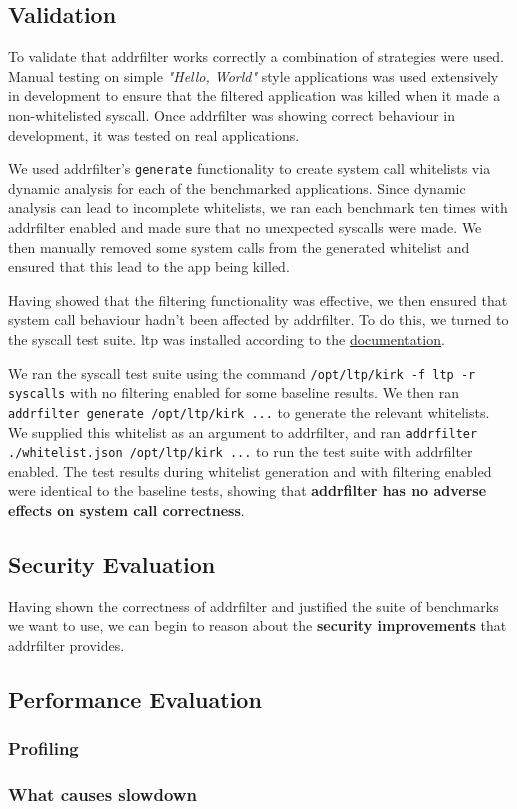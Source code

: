 
\subsection{Validation}

To validate that addrfilter works correctly a combination of strategies were
used. Manual testing on simple \textit{"Hello, World"} style applications was
used extensively in development to ensure that the filtered application was
killed when it made a non-whitelisted syscall. Once addrfilter was showing
correct behaviour in development, it was tested on real applications.

We used addrfilter's \texttt{generate} functionality to create system call
whitelists via dynamic analysis for each of the benchmarked applications.
Since dynamic analysis can lead to incomplete whitelists, we ran each benchmark
ten times with addrfilter enabled and made sure that no unexpected syscalls were
made. We then manually removed some system calls from the generated whitelist and
ensured that this lead to the app being killed.


Having showed that the filtering functionality was effective, we then ensured
that system call behaviour hadn't been affected by addrfilter. To do this, we
turned to the  syscall test suite. \ac{ltp} was installed according to
the
\href{https://linux-test-project.readthedocs.io/en/latest/users/quick_start.html}{documentation}.

We ran the syscall test suite using the command \texttt{/opt/ltp/kirk -f ltp -r
syscalls} with no filtering enabled for some baseline results. We then ran
\texttt{addrfilter generate /opt/ltp/kirk ...} to generate the relevant
whitelists. We supplied this whitelist as an argument to addrfilter, and ran
\texttt{addrfilter ./whitelist.json /opt/ltp/kirk ...} to run the test suite
with addrfilter enabled. The test results during whitelist generation and with
filtering enabled were identical to the baseline tests, showing that \textbf{addrfilter
has no adverse effects on system call correctness}.

\subsection{Security Evaluation}

Having shown the correctness of addrfilter and justified the suite of benchmarks
we want to use, we can begin to reason about the \textbf{security improvements}
that addrfilter provides.

\subsection{Performance Evaluation}\label{subsec:perf-eval}

\subsubsection{Profiling}

\subsubsection{What causes slowdown}\label{subsubsec:slowdown}

